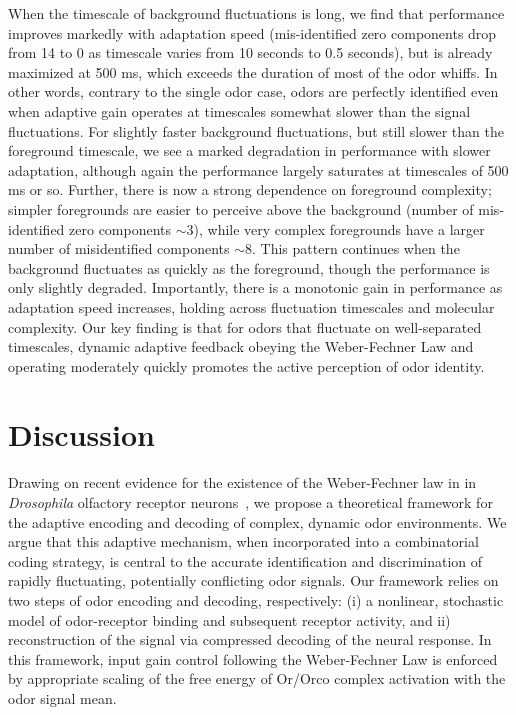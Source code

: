When the timescale of background fluctuations is long, we find that performance improves markedly with adaptation speed (mis-identified zero components drop from 14 to 0 as timescale varies from 10 seconds to 0.5 seconds), but is already maximized at 500 ms, which exceeds the duration of most of the odor whiffs. In other words, contrary to the single odor case, odors are perfectly identified even when adaptive gain operates at timescales somewhat slower than the signal fluctuations. For slightly faster background fluctuations, but still slower than the foreground timescale, we see a marked degradation in performance with slower adaptation, although again the performance largely saturates at timescales of 500 ms or so. Further, there is now a strong dependence on foreground complexity; simpler foregrounds are easier to perceive above the background (number of mis-identified zero components $\sim 3$), while very complex foregrounds have a larger number of misidentified components $\sim 8$. This pattern continues when the background fluctuates as quickly as the foreground, though the performance  is only slightly degraded. Importantly, there is a monotonic gain in performance as adaptation speed increases, holding across fluctuation timescales and molecular complexity. Our key finding is that for odors that fluctuate on well-separated timescales, dynamic adaptive feedback obeying the Weber-Fechner Law and operating moderately quickly promotes the active perception of odor identity. 


\section{Discussion}

Drawing on recent evidence for the existence of the Weber-Fechner law in in \textit{Drosophila} olfactory receptor neurons~\cite{cafaro_WL, cao_WL,  srinivas_elife}, we propose a theoretical framework for the adaptive encoding and decoding of complex, dynamic odor environments. We argue that this adaptive mechanism, when incorporated into a combinatorial coding strategy, is central to the accurate identification and discrimination of rapidly fluctuating, potentially conflicting odor signals. Our framework relies on two steps of odor encoding and decoding, respectively: (i) a nonlinear, stochastic model of odor-receptor binding and subsequent receptor activity, and ii) reconstruction of the signal via compressed decoding of the neural response. In this framework, input gain control following the Weber-Fechner Law is enforced by appropriate scaling of the free energy of Or/Orco complex activation with the odor signal mean. 

